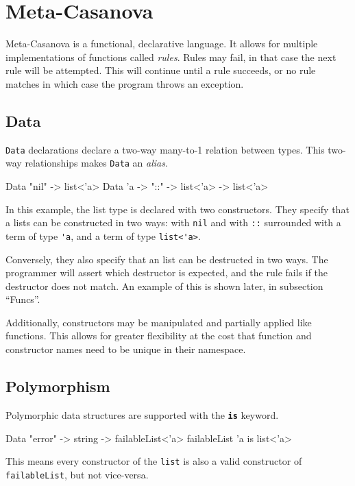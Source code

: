 \section{Meta-Casanova}
  Meta-Casanova is a functional, declarative language.
  It allows for multiple implementations of functions called \textit{rules}.
  Rules may fail, in that case the next rule will be attempted.
  This will continue until a rule succeeds, or no rule matches in which case the program throws an exception.
  
  \subsection{Data}
  \texttt{Data} declarations declare a two-way \mbox{many-to-1} relation between types.
  This two-way relationships makes \texttt{Data} an \textit{alias}.

  \begin{code}
  Data "nil" -> list<'a>
  Data 'a -> "::" -> list<'a> -> list<'a>
  \end{code}

  In this example, the list type is declared with two constructors.
  They specify that a lists can be constructed in two ways: with \verb|nil| and with \verb|::| surrounded with a term of type \verb|'a|, and a term of type \verb|list<'a>|.

  Conversely, they also specify that an list can be destructed in two ways.
  The programmer will assert which destructor is expected, and the rule fails if the destructor does not match.
  An example of this is shown later, in subsection ``Funcs''.

  Additionally, constructors may be manipulated and partially applied like functions.
  This allows for greater flexibility at the cost that function and constructor names need to be unique in their namespace.

  \subsection{Polymorphism}
  Polymorphic data structures are supported with the \textbf{\texttt{is}} keyword.

  \begin{code}
  Data "error" -> string -> failableList<'a>
  failableList 'a is list<'a>
  \end{code}

  \noindent
  This means every constructor of the \verb|list| is also a valid constructor of \verb|failableList|, but not vice-versa.

